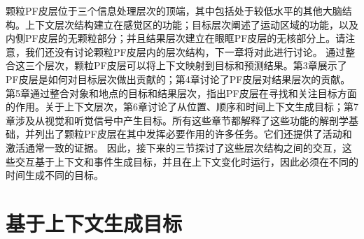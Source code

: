 颗粒PF皮层位于三个信息处理层次的顶端，其中包括处于较低水平的其他大脑结构。上下文层次结构建立在感觉区的功能；目标层次阐述了运动区域的功能，以及内侧PF皮层的无颗粒部分；并且结果层次建立在眼眶PF皮层的无核部分上。请注意，我们还没有讨论颗粒PF皮层内的层次结构，下一章将对此进行讨论。
通过整合这三个层次，颗粒PF皮层可以将上下文映射到目标和预测结果。第3章展示了PF皮层是如何对目标层次做出贡献的；第4章讨论了PF皮层对结果层次的贡献。第5章通过整合对象和地点的目标和结果层次，指出PF皮层在寻找和关注目标方面的作用。关于上下文层次，第6章讨论了从位置、顺序和时间上下文生成目标；第7章涉及从视觉和听觉信号中产生目标。所有这些章节都解释了这些功能的解剖学基础，并列出了颗粒PF皮层在其中发挥必要作用的许多任务。它们还提供了活动和激活通常一致的证据。
因此，接下来的三节探讨了这些层次结构之间的交互，这些交互基于上下文和事件生成目标，并且在上下文变化时运行，因此必须在不同的时间生成不同的目标。


\section{基于上下文生成目标}

